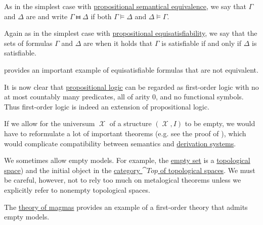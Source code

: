 \begin{definition}
\begin{thmenum}
     As in the simplest case with \hyperref[def:propositional_semantics/equivalence]{propositional semantical equivalence}, we say that \( \Gamma \) and \( \Delta \) are  and write \( \Gamma \gleichstark \Delta \) if both \( \Gamma \vDash \Delta \) and \( \Delta \vDash \Gamma \).

     Again as in the simplest case with \hyperref[def:propositional_semantics/equisatisfiability]{propositional equisatisfiability}, we say that the sets of formulas \( \Gamma \) and \( \Delta \) are  when it holds that \( \Gamma \) is satisfiable if and only if \( \Delta \) is satisfiable.

     provides an important example of equisatisfiable formulas that are not equivalent.
  \end{thmenum}
\end{definition}

\begin{remark}\label{rem:propositional_logic_as_first_order_logic}
  It is now clear that \hyperref[subsec:propositional_logic]{propositional logic} can be regarded as first-order logic with no at most countably many predicates, all of arity 0, and no functional symbols. Thus first-order logic is indeed an extension of propositional logic.
\end{remark}

\begin{remark}\label{rem:empty_models}
   If we allow for the universum \( \mscrX \) of a structure \( (\mscrX, I) \) to be empty, we would have to reformulate a lot of important theorems (e.g. see the proof of ), which would complicate compatibility between semantics and \hyperref[def:first_order_derivation_system]{derivation systems}.

   We sometimes allow empty models. For example, the \hyperref[def:set_zfc/A2]{empty set} is a \hyperref[def:topological_space]{topological space}) and the initial object in the \hyperref[def:category_of_topological_spaces]{category \( \cat{Top} \) of topological spaces}. We must be careful, however, not to rely too much on metalogical theorems unless we explicitly refer to nonempty topological spaces.

   The \hyperref[def:magma/theory]{theory of magmas} provides an example of a first-order theory that admits empty models.
\end{remark}

